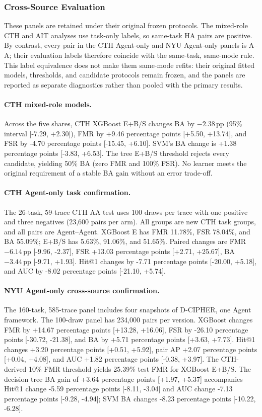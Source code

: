 \documentclass[10pt]{article}
\newcommand{\pp}{\ensuremath{\,\mathrm{pp}}}
\begin{document}
\subsubsection{Cross-Source Evaluation}
These panels are retained under their original frozen protocols. The mixed-role CTH and AIT analyses use task-only labels, so same-task HA pairs are positive. By contrast, every pair in the CTH Agent-only and NYU Agent-only panels is A--A; their evaluation labels therefore coincide with the same-task, same-mode rule. This label equivalence does not make them same-mode refits: their original fitted models, thresholds, and candidate protocols remain frozen, and the panels are reported as separate diagnostics rather than pooled with the primary results.
\paragraph{CTH mixed-role models.} Across the five shares, CTH XGBoost E+B/S changes BA by $-2.38\pp$ (95\% interval [-7.29, +2.30]), FMR by +9.46 percentage points [+5.50, +13.74], and FSR by -4.70 percentage points [-15.45, +6.10]. SVM's BA change is +1.38 percentage points [-3.83, +6.53]. The tree E+B/S threshold rejects every candidate, yielding 50\% BA (zero FMR and 100\% FSR). No learner meets the original requirement of a stable BA gain without an error trade-off.

\paragraph{CTH Agent-only task confirmation.} The 26-task, 59-trace CTH AA test uses 100 draws per trace with one positive and three negatives (23,600 pairs per arm). All groups are new CTH task groups, and all pairs are Agent--Agent. XGBoost E has FMR 11.78\%, FSR 78.04\%, and BA 55.09\%; E+B/S has 5.63\%, 91.06\%, and 51.65\%. Paired changes are FMR $-6.14\pp$ [-9.96, -2.37], FSR +13.03 percentage points [+2.71, +25.67], BA $-3.44\pp$ [-9.71, +1.93]. Hit@1 changes by -7.71 percentage points [-20.00, +5.18], and AUC by -8.02 percentage points [-21.10, +5.74].

\paragraph{NYU Agent-only cross-source confirmation.} The 160-task, 585-trace panel includes four snapshots of D-CIPHER, one Agent framework. The 100-draw panel has 234,000 pairs per version. XGBoost changes FMR by +14.67 percentage points [+13.28, +16.06], FSR by -26.10 percentage points [-30.72, -21.38], and BA by +5.71 percentage points [+3.63, +7.73]. Hit@1 changes +3.20 percentage points [+0.51, +5.92], pair AP +2.07 percentage points [+0.04, +4.08], and AUC +1.82 percentage points [-0.38, +3.97]. The CTH-derived 10\% FMR threshold yields 25.39\% test FMR for XGBoost E+B/S. The decision tree BA gain of +3.64 percentage points [+1.97, +5.37] accompanies Hit@1 change -5.59 percentage points [-8.11, -3.04] and AUC change -7.13 percentage points [-9.28, -4.94]; SVM BA changes -8.23 percentage points [-10.22, -6.28].
\end{document}
